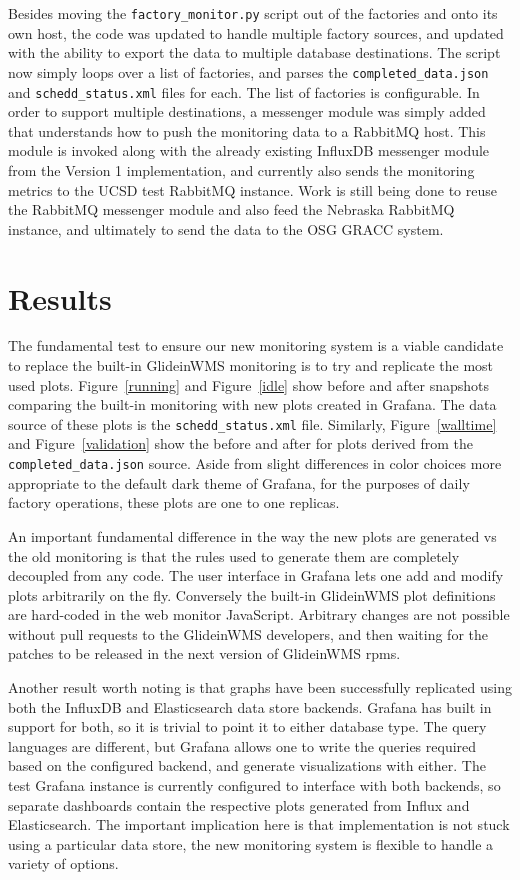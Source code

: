 \documentclass{webofc}
\begin{document}
Besides moving the \verb"factory_monitor.py" script out of the factories and onto its own host, the code was updated to handle multiple factory sources, and updated with the ability to export the data to multiple database destinations. The script now simply loops over a list of factories, and parses the \verb"completed_data.json" and \verb"schedd_status.xml" files for each. The list of factories is configurable. In order to support multiple destinations, a messenger module was simply added that understands how to push the monitoring data to a RabbitMQ host. This module is invoked along with the already existing InfluxDB messenger module from the Version 1 implementation, and currently also sends the monitoring metrics to the UCSD test RabbitMQ instance. Work is still being done to reuse the RabbitMQ messenger module and also feed the Nebraska RabbitMQ instance, and ultimately to send the data to the OSG GRACC system.

\section{Results}
\label{results}
The fundamental test to ensure our new monitoring system is a viable candidate to replace the built-in GlideinWMS monitoring is to try and replicate the most used plots. Figure~\ref{running} and Figure~\ref{idle} show before and after snapshots comparing the built-in monitoring with new plots created in Grafana. The data source of these plots is the \verb"schedd_status.xml" file. Similarly, Figure~\ref{walltime} and Figure~\ref{validation} show the before and after for plots derived from the \verb"completed_data.json" source. Aside from slight differences in color choices more appropriate to the default dark theme of Grafana, for the purposes of daily factory operations, these plots are one to one replicas.

An important fundamental difference in the way the new plots are generated vs the old monitoring is that the rules used to generate them are completely decoupled from any code. The user interface in Grafana lets one add and modify plots arbitrarily on the fly. Conversely the built-in GlideinWMS plot definitions are hard-coded in the web monitor JavaScript. Arbitrary changes are not possible without pull requests to the GlideinWMS developers, and then waiting for the patches to be released in the next version of GlideinWMS rpms.

Another result worth noting is that graphs have been successfully replicated using both the InfluxDB and Elasticsearch data store backends. Grafana has built in support for both, so it is trivial to point it to either database type. The query languages are different, but Grafana allows one to write the queries required based on the configured backend, and generate visualizations with either. The test Grafana instance is currently configured to interface with both backends, so separate dashboards contain the respective plots generated from Influx and Elasticsearch. The important implication here is that implementation is not stuck using a particular data store, the new monitoring system is flexible to handle a variety of options.
\end{document}
